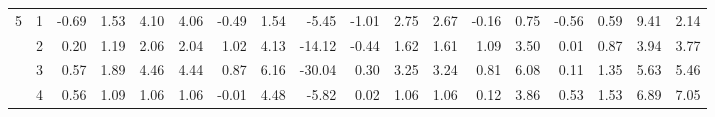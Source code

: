 \begin{tabular}{llrrrrrrrrrrrrrrrr}
5 & 1 &               -0.69 &  1.53 &          4.10 &   4.06 &                           -0.49 &  1.54 &                                        -5.45 & -1.01 &       2.75 &  2.67 &               -0.16 &   0.75 &                 -0.56 &  0.59 &        9.41 &  2.14 \\
  & 2 &                0.20 &  1.19 &          2.06 &   2.04 &                            1.02 &  4.13 &                                       -14.12 & -0.44 &       1.62 &  1.61 &                1.09 &   3.50 &                  0.01 &  0.87 &        3.94 &  3.77 \\
  & 3 &                0.57 &  1.89 &          4.46 &   4.44 &                            0.87 &  6.16 &                                       -30.04 &  0.30 &       3.25 &  3.24 &                0.81 &   6.08 &                  0.11 &  1.35 &        5.63 &  5.46 \\
  & 4 &                0.56 &  1.09 &          1.06 &   1.06 &                           -0.01 &  4.48 &                                        -5.82 &  0.02 &       1.06 &  1.06 &                0.12 &   3.86 &                  0.53 &  1.53 &        6.89 &  7.05 \\
\bottomrule
\end{tabular}
